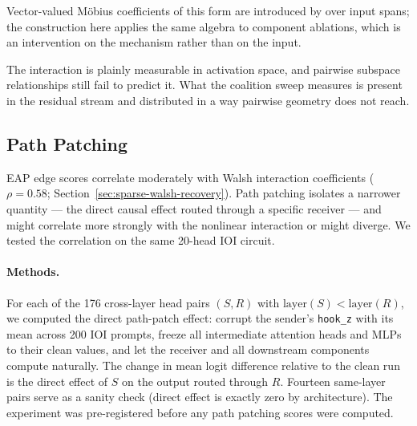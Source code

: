 \documentclass{article}
\begin{document}
Vector-valued M\"obius coefficients of this form are introduced by
\citet{jansma2026compositional} over input spans; the construction
here applies the same algebra to component ablations, which is an intervention on the
mechanism rather than on the input.

The interaction is plainly measurable in activation space, and pairwise subspace relationships still fail to predict it. What the coalition
sweep measures is present in the residual stream and distributed in a way pairwise
geometry does not reach.


%
%

\subsection{Path Patching}
\label{sec:path-patching}

EAP edge scores correlate moderately with Walsh interaction coefficients
($\rho = 0.58$; Section~\ref{sec:sparse-walsh-recovery}). Path patching
isolates a narrower quantity --- the direct causal effect routed through a
specific receiver --- and might correlate more strongly with the
nonlinear interaction or might diverge. We tested the correlation on the same
20-head IOI circuit.

\paragraph{Methods.}

For each of the 176 cross-layer head pairs $(S, R)$ with
$\text{layer}(S) < \text{layer}(R)$, we computed the direct path-patch
effect: corrupt the sender's \texttt{hook\_z} with its mean across 200
IOI prompts, freeze all intermediate attention heads and MLPs to their
clean values, and let the receiver and all downstream components compute
naturally. The change in mean logit difference relative to the clean run
is the direct effect of $S$ on the output routed through $R$. Fourteen
same-layer pairs serve as a sanity check (direct effect is exactly zero
by architecture). The experiment was pre-registered before any path
patching scores were computed.
\end{document}
